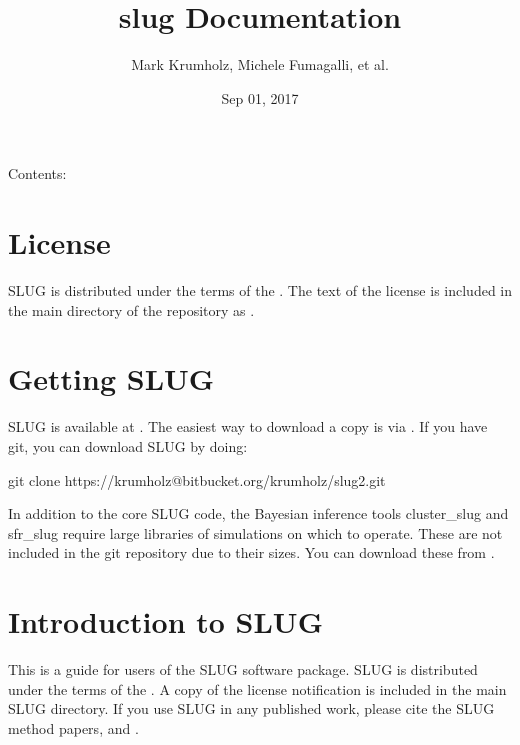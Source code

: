 \documentclass[letterpaper,10pt,english]{sphinxmanual}
\title{slug Documentation}
\date{Sep 01, 2017}
\author{Mark Krumholz, Michele Fumagalli, et al.}
\begin{document}
\maketitle
\sphinxtableofcontents
{}\label{\detokenize{index::doc}}


Contents:


\chapter{License}
\label{\detokenize{license:welcome-to-slug-s-documentation}}\label{\detokenize{license:license}}\label{\detokenize{license::doc}}
SLUG is distributed under the terms of the . The text of the license is included in the main directory of the repository as .


\chapter{Getting SLUG}
\label{\detokenize{getting:getting-slug}}\label{\detokenize{getting::doc}}
SLUG is available at . The easiest way to download a copy is via . If you have git, you can download SLUG by doing:

\begin{sphinxVerbatim}[commandchars=\\\{\}]
git clone https://krumholz@bitbucket.org/krumholz/slug2.git
\end{sphinxVerbatim}

In addition to the core SLUG code, the Bayesian inference tools cluster\_slug and sfr\_slug require large libraries of simulations on which to operate. These are not included in the git repository due to their sizes. You can download these from .


\chapter{Introduction to SLUG}
\label{\detokenize{intro:introduction-to-slug}}\label{\detokenize{intro::doc}}
This is a guide for users of the SLUG software package. SLUG is distributed under the terms of the . A copy of the license notification is included in the main SLUG directory. If you use SLUG in any published work, please cite the SLUG method papers,  and .
\end{document}
